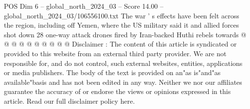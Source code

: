 \begin{textsample}{POS Dim 6 – global\_north\_2024\_03 – Score 14.00 – global\_north\_2024\_03/106556100.txt}
The war ' s effects have been felt across the region, including off Yemen, where the US military said it and allied forces shot down 28 one-way attack drones fired by Iran-backed Huthi rebels towards @ @ @ @ @ @ @ @ @ @ Disclaimer : The content of this article is syndicated or provided to this website from an external third party provider.
We are not responsible for, and do not control, such external websites, entities, applications or media publishers.
The body of the text is provided on an"as is"and"as available"basis and has not been edited in any way.
Neither we nor our affiliates guarantee the accuracy of or endorse the views or opinions expressed in this article.
Read our full disclaimer policy here.

\end{textsample}
